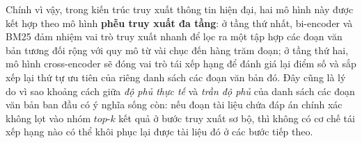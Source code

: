 Chính vì vậy, trong kiến trúc truy xuất thông tin hiện đại, hai mô hình này được kết hợp theo mô hình \textbf{phễu truy xuất đa tầng}: ở tầng thứ nhất, bi-encoder và BM25 đảm nhiệm vai trò truy xuất nhanh để lọc ra một tập hợp các đoạn văn bản tương đối rộng với quy mô từ vài chục đến hàng trăm đoạn; ở tầng thứ hai, mô hình cross-encoder sẽ đóng vai trò tái xếp hạng để đánh giá lại điểm số và sắp xếp lại thứ tự ưu tiên của riêng danh sách các đoạn văn bản đó. Đây cũng là lý do vì sao khoảng cách giữa \textit{độ phủ thực tế} và \textit{trần độ phủ} của danh sách các đoạn văn bản ban đầu có ý nghĩa sống còn: nếu đoạn tài liệu chứa đáp án chính xác không lọt vào nhóm $top\text{-}k$ kết quả ở bước truy xuất sơ bộ, thì không có cơ chế tái xếp hạng nào có thể khôi phục lại được tài liệu đó ở các bước tiếp theo.


